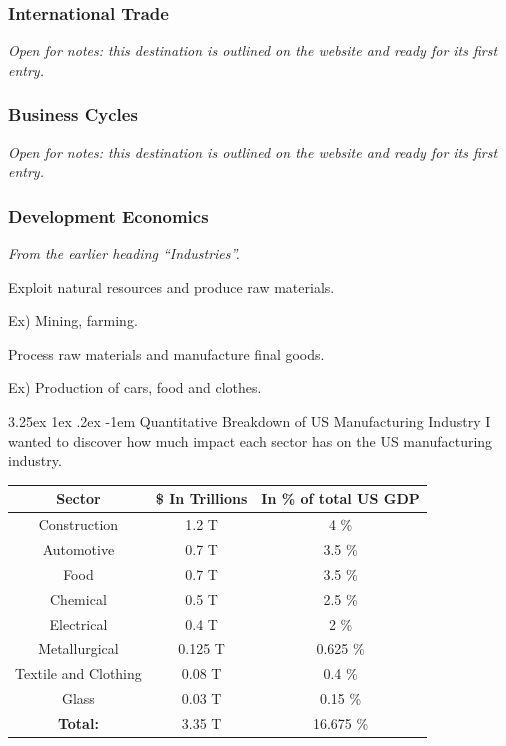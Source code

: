 \documentclass{article}
\makeatletter
\newcounter{subsubsubsection}[subsubsection]
\renewcommand\subparagraph{\@startsection{subparagraph}{6}{\parindent}%
  {3.25ex \@plus1ex \@minus .2ex}%
  {-1em}%
  {\normalfont\normalsize\bfseries}}
\makeatother
\begin{document}
\subsubsection{International Trade}\label{sec:international-trade}
\textit{Open for notes: this destination is outlined on the website and ready for its first entry.}

\subsubsection{Business Cycles}\label{sec:business-cycles}
\textit{Open for notes: this destination is outlined on the website and ready for its first entry.}

\subsubsection{Development Economics}\label{sec:development-economics}

\textit{From the earlier heading ``Industries''.}

\newpage

Exploit natural resources and produce raw materials. 

Ex) Mining, farming. 

\newpage

Process raw materials and manufacture final goods.

Ex) Production of cars, food and clothes. 

\newpage

\subparagraph{Quantitative Breakdown of US Manufacturing Industry}
I wanted to discover how much impact each sector has on the US manufacturing industry.

\begin{center}
 \begin{tabular}{||c c c||} 
 \hline
 \textbf{Sector} & \textbf{\$ In Trillions} & \textbf{In \% of total US GDP} \\ [0.5ex] 
 \hline\hline
 Construction & 1.2 T & 4 \% \\ [1ex] 
 \hline
 Automotive & 0.7 T & 3.5 \% \\ [1ex] 
 \hline
 Food & 0.7 T & 3.5 \% \\ [1ex] 
 \hline
 Chemical & 0.5 T & 2.5 \% \\ [1ex] 
 \hline
 Electrical & 0.4 T & 2 \% \\ [1ex] 
 \hline
 Metallurgical & 0.125 T & 0.625 \% \\ [1ex] 
 \hline
 Textile and Clothing & 0.08 T & 0.4 \% \\ [1ex] 
 \hline
 Glass & 0.03 T & 0.15 \% \\ [1ex] 
 \hline
 \hline
  \textbf{Total:} & 3.35 T & 16.675 \% \\ [1ex] 
 \hline 
\end{tabular}
\end{center}
\end{document}
